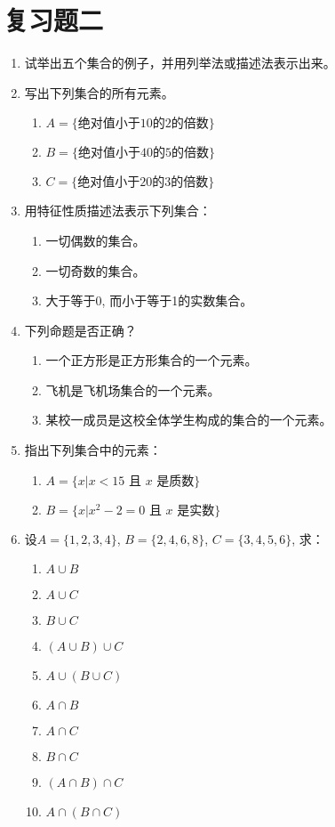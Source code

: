 \section*{复习题二}
\begin{enumerate}
	\item 试举出五个集合的例子，并用列举法或描述法表示出来。
	\item 写出下列集合的所有元素。
\begin{enumerate}
	\item $A=\{\text{绝对值小于10的2的倍数}\}$
	\item $B=\{\text{绝对值小于40的5的倍数}\}$
	\item $C=\{\text{绝对值小于20的3的倍数}\}$
\end{enumerate}

\item 用特征性质描述法表示下列集合：
\begin{enumerate}
	\item 一切偶数的集合。
	\item 一切奇数的集合。
	\item 大于等于0, 而小于等于1的实数集合。
\end{enumerate}

\item 下列命题是否正确？
\begin{enumerate}
	\item 一个正方形是正方形集合的一个元素。
	\item 飞机是飞机场集合的一个元素。
	\item 某校一成员是这校全体学生构成的集合的一个元素。
\end{enumerate}

\item 指出下列集合中的元素：
\begin{enumerate}
	\item $A=\{x|x<15\text{ 且 $x$ 是质数}\}$
	\item $B=\{x|x^2-2=0\text{ 且 $x$ 是实数}\}$
\end{enumerate}

\item 设$A=\{1,2,3,4\}$, $B=\{ 2,4,6,8\}$, $C=\{3,4,5,6\}$, 求：
\begin{multicols}{4}
\begin{enumerate}
	\item $A\cup B$
	\item $A\cup C$
	\item $B\cup C$
	\item $(A\cup B)\cup C$
	\item $A\cup (B\cup C)$
	\item $A\cap B$
	\item $A\cap C$
	\item $B\cap C$
	\item $(A\cap B)\cap C$
	\item $A\cap (B\cap C)$
\end{enumerate}	
\end{multicols}



\end{enumerate}
